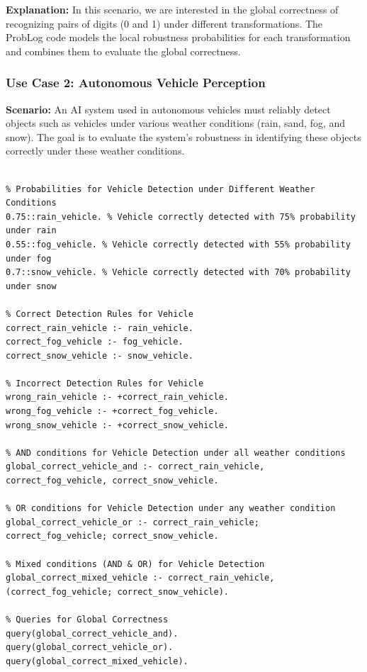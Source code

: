 \textbf{Explanation:} In this scenario, we are interested in the global correctness of recognizing pairs of digits (0 and 1) under different transformations. The ProbLog code models the local robustness probabilities for each transformation and combines them to evaluate the global correctness.

\subsubsection{Use Case 2: Autonomous Vehicle Perception}

\textbf{Scenario:} An AI system used in autonomous vehicles must reliably detect objects such as vehicles under various weather conditions (rain, sand, fog, and snow). The goal is to evaluate the system's robustness in identifying these objects correctly under these weather conditions.

\begin{mdframed}[leftline=false, rightline=false, topline=true, bottomline=true]
  \scriptsize
  \begin{verbatim}

% Probabilities for Vehicle Detection under Different Weather Conditions
0.75::rain_vehicle. % Vehicle correctly detected with 75% probability under rain
0.55::fog_vehicle. % Vehicle correctly detected with 55% probability under fog
0.7::snow_vehicle. % Vehicle correctly detected with 70% probability under snow

% Correct Detection Rules for Vehicle
correct_rain_vehicle :- rain_vehicle.
correct_fog_vehicle :- fog_vehicle.
correct_snow_vehicle :- snow_vehicle.

% Incorrect Detection Rules for Vehicle
wrong_rain_vehicle :- +correct_rain_vehicle.
wrong_fog_vehicle :- +correct_fog_vehicle.
wrong_snow_vehicle :- +correct_snow_vehicle.

% AND conditions for Vehicle Detection under all weather conditions
global_correct_vehicle_and :- correct_rain_vehicle, correct_fog_vehicle, correct_snow_vehicle.

% OR conditions for Vehicle Detection under any weather condition
global_correct_vehicle_or :- correct_rain_vehicle; correct_fog_vehicle; correct_snow_vehicle.

% Mixed conditions (AND & OR) for Vehicle Detection
global_correct_mixed_vehicle :- correct_rain_vehicle, (correct_fog_vehicle; correct_snow_vehicle).

% Queries for Global Correctness
query(global_correct_vehicle_and).
query(global_correct_vehicle_or).
query(global_correct_mixed_vehicle).
\end{verbatim}
\end{mdframed}

